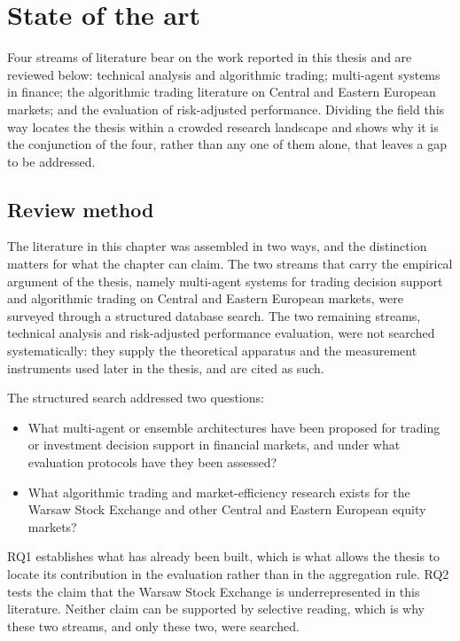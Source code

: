 \chapter{State of the art}\label{sec:related_work}

Four streams of literature bear on the work reported in this thesis and are reviewed below: technical analysis and algorithmic trading; multi-agent systems in finance; the algorithmic trading literature on Central and Eastern European markets; and the evaluation of risk-adjusted performance. Dividing the field this way locates the thesis within a crowded research landscape and shows why it is the conjunction of the four, rather than any one of them alone, that leaves a gap to be addressed.

\section{Review method}\label{sec:review_method}

The literature in this chapter was assembled in two ways, and the distinction matters for what the chapter can claim. The two streams that carry the empirical argument of the thesis, namely multi-agent systems for trading decision support and algorithmic trading on Central and Eastern European markets, were surveyed through a structured database search. The two remaining streams, technical analysis and risk-adjusted performance evaluation, were not searched systematically: they supply the theoretical apparatus and the measurement instruments used later in the thesis, and are cited as such.

The structured search addressed two questions:

\begin{itemize}[leftmargin=2.2cm]
    \item[\textbf{RQ1}] What multi-agent or ensemble architectures have been proposed for trading or investment decision support in financial markets, and under what evaluation protocols have they been assessed?
    \item[\textbf{RQ2}] What algorithmic trading and market-efficiency research exists for the Warsaw Stock Exchange and other Central and Eastern European equity markets?
\end{itemize}

RQ1 establishes what has already been built, which is what allows the thesis to locate its contribution in the evaluation rather than in the aggregation rule. RQ2 tests the claim that the Warsaw Stock Exchange is underrepresented in this literature. Neither claim can be supported by selective reading, which is why these two streams, and only these two, were searched.

